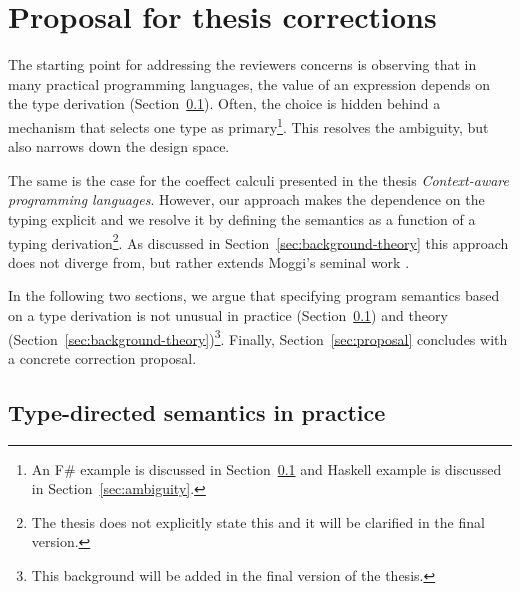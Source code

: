\documentclass[
		twoside,openright,titlepage,numbers=noenddot,headinclude,%
                footinclude=true,cleardoublepage=empty,
                BCOR=10mm,paper=a4,fontsize=10pt, %
                ngerman,american, %
                ]{scrreprt}
\begin{document}
\frenchspacing %
\raggedbottom %
\pagestyle{plain} %



\chapter*{Proposal for thesis corrections}
\renewcommand*\thesection{\arabic{section}}

The starting point for addressing the reviewers concerns is observing that in many practical
programming languages, the value of an expression depends on the type derivation
(Section~\ref{sec:background-practice}). Often, the choice is hidden behind a mechanism that
selects one type as primary\footnote{An F\# example is discussed in Section~\ref{sec:background-practice}
and Haskell example is discussed in Section~\ref{sec:ambiguity}.}. This resolves the ambiguity,
but also narrows down the design space.

The same is the case for the coeffect calculi presented in the thesis \emph{Context-aware programming
languages}. However, our approach makes the dependence on the typing explicit and we resolve it by
defining the semantics as a function of a typing derivation\footnote{The thesis does not explicitly
state this and it will be clarified in the final version.}. As discussed in Section~\ref{sec:background-theory}
this approach does not diverge from, but rather extends Moggi's seminal work \cite{monad-notions}.

In the following two sections, we argue that specifying program semantics based on a type derivation
is not unusual in practice (Section~\ref{sec:background-practice}) and theory
(Section~\ref{sec:background-theory})\footnote{This background will be added in the final version of the thesis.}.
Finally, Section~\ref{sec:proposal} concludes with a concrete correction proposal.

\section{Type-directed semantics in practice}
\label{sec:background-practice}
\end{document}
